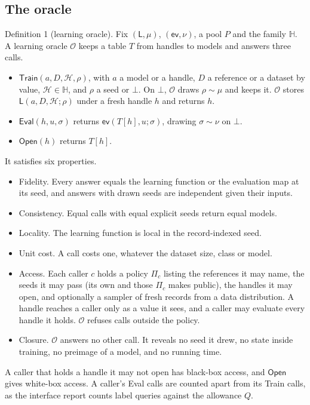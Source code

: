 \documentclass{labreport}
\newcommand{\Hc}{\mathcal{H}}
\newcommand{\HH}{\mathbb{H}}
\newcommand{\Lf}{\mathsf{L}}
\newcommand{\ev}{\mathsf{ev}}
\newcommand{\Or}{\mathcal{O}}
\newcommand{\call}[1]{\textsf{#1}}
\begin{document}
\subsection*{The oracle}
Definition 1 (learning oracle). Fix $(\Lf,\mu)$, $(\ev,\nu)$, a pool $P$ and the
family $\HH$. A learning oracle $\Or$ keeps a table $T$ from handles to models
and answers three calls.
\begin{itemize}
\item $\call{Train}(a,D,\Hc,\rho)$, with $a$ a model or a handle, $D$ a reference
  or a dataset by value, $\Hc\in\HH$, and $\rho$ a seed or $\bot$. On $\bot$,
  $\Or$ draws $\rho\sim\mu$ and keeps it. $\Or$ stores $\Lf(a,D,\Hc;\rho)$ under a
  fresh handle $h$ and returns $h$.
\item $\call{Eval}(h,u,\sigma)$ returns $\ev(T[h],u;\sigma)$, drawing
  $\sigma\sim\nu$ on $\bot$.
\item $\call{Open}(h)$ returns $T[h]$.
\end{itemize}
It satisfies six properties.
\begin{itemize}
\item Fidelity. Every answer equals the learning function or the evaluation
  map at its seed, and answers with drawn seeds are independent given their
  inputs.
\item Consistency. Equal calls with equal explicit seeds return equal models.
\item Locality. The learning function is local in the record-indexed seed.
\item Unit cost. A call costs one, whatever the dataset size, class or model.
\item Access. Each caller $c$ holds a policy $\Pi_c$ listing the references
  it may name, the seeds it may pass (its own and those $\Pi_c$ makes public),
  the handles it may open, and optionally a sampler of fresh records from a data
  distribution. A handle reaches a caller only as a value it sees, and a caller
  may evaluate every handle it holds. $\Or$ refuses calls outside the policy.
\item Closure. $\Or$ answers no other call. It reveals no seed it drew, no
  state inside training, no preimage of a model, and no running time.
\end{itemize}
A caller that holds a handle it may not open has black-box access, and
$\call{Open}$ gives white-box access. A caller's \call{Eval} calls are counted
apart from its \call{Train} calls, as the interface report counts label queries
against the allowance $Q$.
\end{document}
